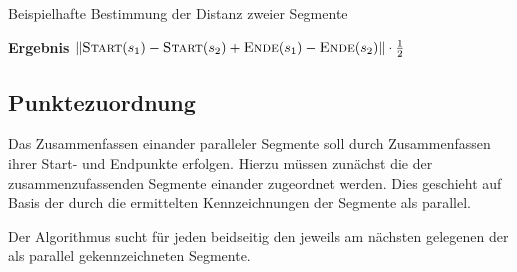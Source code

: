 \documentclass[../main/thesis.tex]{subfiles}
\begin{document}
\begin{algorithmhere}{Beispielhafte Bestimmung der Distanz zweier Segmente}
\label{alg:Distanz}
\begin{algorithmic}
	\State \textbf{Ergebnis} $\abs\textproc{Start}(s_1) - \textproc{Start}(s_2) + \textproc{Ende}(s_1) - \textproc{Ende}(s_2)\abs \cdot \frac{1}{2}$
\EndFunction
\end{algorithmic}
\end{algorithmhere}



\subsection{Punktezuordnung}
\label{ch:correlation-algorithm}

%
%

Das Zusammenfassen einander paralleler Segmente soll durch Zusammenfassen ihrer Start- und Endpunkte erfolgen.
Hierzu müssen zunächst die  der zusammenzufassenden Segmente einander zugeordnet werden.
Dies geschieht auf Basis der durch die  ermittelten Kennzeichnungen der Segmente als parallel.

Der Algorithmus  sucht für jeden  beidseitig den jeweils am nächsten gelegenen  der als parallel gekennzeichneten Segmente.
\end{document}
